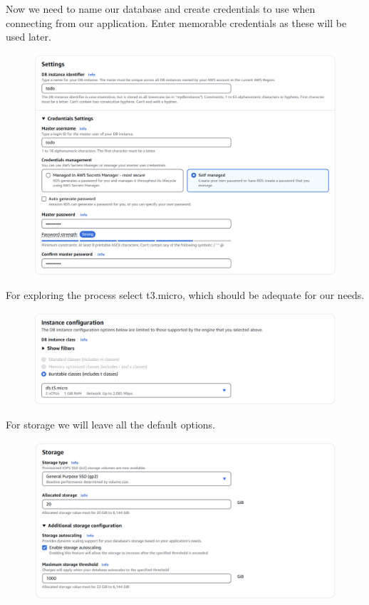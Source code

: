 \documentclass{csse4400}
\begin{document}
\newpage
\noindent
Now we need to name our database and create credentials to use when connecting from our application.
Enter memorable credentials as these will be used later.

\begin{figure}[H]
  \includegraphics[trim=0 1 0 3,clip,width=\textwidth]{images/db3}
\end{figure}

\noindent
For exploring the process select t3.micro, which should be adequate for our needs.


\begin{figure}[H]
  \includegraphics[width=\textwidth]{images/db4}
\end{figure}

\newpage
\noindent
For storage we will leave all the default options.

\begin{figure}[H]
  \includegraphics[width=\textwidth]{images/db5}
\end{figure}
\end{document}
